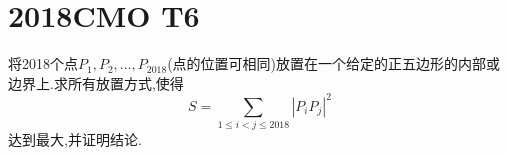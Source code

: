 \documentclass[]{article}
\title{}
\author{}
\date{}
\begin{document}
\maketitle
\section{2018CMO T6}{
将2018个点$P_1,P_2,…,P_{2018}$(点的位置可相同)放置在一个给定的正五边形的内部或边界上.求所有放置方式,使得
\begin{equation}\nonumber
    S=\sum\limits_{1\leq i<j\leq 2018}\left| P_i P_j \right|^2
\end{equation}
达到最大,并证明结论.
}
\end{document}
